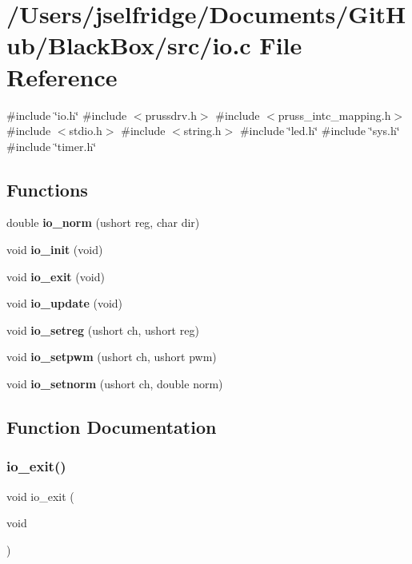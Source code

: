 \section{/\+Users/jselfridge/\+Documents/\+Git\+Hub/\+Black\+Box/src/io.c File Reference}
\label{io_8c}
{\ttfamily \#include \char`\"{}io.\+h\char`\"{}}\newline
{\ttfamily \#include $<$prussdrv.\+h$>$}\newline
{\ttfamily \#include $<$pruss\+\_\+intc\+\_\+mapping.\+h$>$}\newline
{\ttfamily \#include $<$stdio.\+h$>$}\newline
{\ttfamily \#include $<$string.\+h$>$}\newline
{\ttfamily \#include \char`\"{}led.\+h\char`\"{}}\newline
{\ttfamily \#include \char`\"{}sys.\+h\char`\"{}}\newline
{\ttfamily \#include \char`\"{}timer.\+h\char`\"{}}\newline
\subsection*{Functions}
\begin{DoxyCompactItemize}
\item 
double \textbf{ io\+\_\+norm} (ushort reg, char dir)
\item 
void \textbf{ io\+\_\+init} (void)
\item 
void \textbf{ io\+\_\+exit} (void)
\item 
void \textbf{ io\+\_\+update} (void)
\item 
void \textbf{ io\+\_\+setreg} (ushort ch, ushort reg)
\item 
void \textbf{ io\+\_\+setpwm} (ushort ch, ushort pwm)
\item 
void \textbf{ io\+\_\+setnorm} (ushort ch, double norm)
\end{DoxyCompactItemize}


\subsection{Function Documentation}
\mbox{\label{io_8c_ac0fe83d7ffc0214717ecc49383b3b714}} 
\subsubsection{io\+\_\+exit()}
{\footnotesize\ttfamily void io\+\_\+exit (\begin{DoxyParamCaption}\item[{void}]{ }\end{DoxyParamCaption})}

